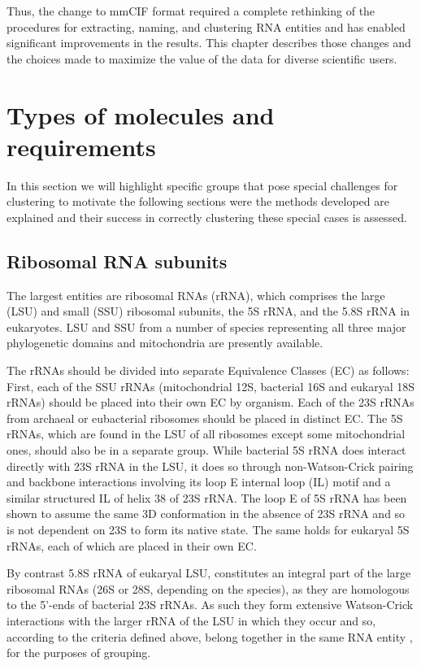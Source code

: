 Thus, the change to mmCIF format required a complete rethinking of the
procedures for extracting, naming, and clustering RNA entities and has enabled
significant improvements in the results. This chapter describes those changes
and the choices made to maximize the value of the data for diverse scientific
users.

\section{Types of molecules and requirements}

In this section we will highlight specific groups that pose special challenges
for clustering to motivate the following sections were the methods developed are
explained and their success in correctly clustering these special cases is
assessed.

\subsection{Ribosomal RNA subunits}

The largest entities are ribosomal RNAs (rRNA), which comprises the large (LSU)
and small (SSU) ribosomal subunits, the 5S rRNA, and the 5.8S rRNA in
eukaryotes. LSU and SSU from a number of species representing all three major
phylogenetic domains and mitochondria are presently available.

The rRNAs should be divided into separate Equivalence Classes (EC) as follows:
First, each of the SSU rRNAs (mitochondrial 12S, bacterial 16S and eukaryal 18S
rRNAs) should be placed into their own EC by organism. Each of the 23S rRNAs
from archaeal or eubacterial ribosomes should be placed in distinct EC. The 5S
rRNAs, which are found in the LSU of all ribosomes except some mitochondrial
ones, should also be in a separate group. While bacterial 5S rRNA does interact
directly with 23S rRNA in the LSU, it does so through non-Watson-Crick pairing
and backbone interactions involving its loop E internal loop (IL) motif and a
similar structured IL of helix 38 of 23S rRNA. The loop E of 5S rRNA has been
shown to assume the same 3D conformation in the absence of 23S rRNA and so is
not dependent on 23S to form its native state. The same holds for eukaryal 5S
rRNAs, each of which are placed in their own EC.

By contrast 5.8S rRNA of eukaryal LSU, constitutes an integral part of the large
ribosomal RNAs (26S or 28S, depending on the species), as they are homologous to
the 5’-ends of bacterial 23S rRNAs. As such they form extensive Watson-Crick
interactions with the larger rRNA of the LSU in which they occur and so,
according to the criteria defined above, belong together in the same RNA entity
, for the purposes of grouping.

